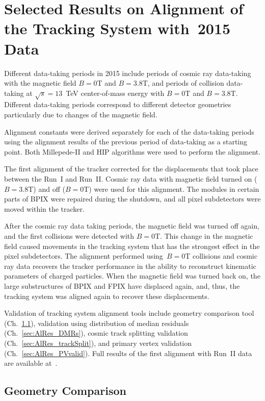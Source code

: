 \section{Selected Results on Alignment of the Tracking System with~2015 Data}
\label{sec:alignmentResults}

Different data-taking periods in 2015 include periods of cosmic ray data-taking with the magnetic field $B=0$T and $B=3.8$T, and periods of collision data-taking at $\sqrt{s}=13$~TeV center-of-mass energy with $B=0$T and $B=3.8$T. Different data-taking periods correspond to different detector geometries particularly due to changes of the magnetic field. 

Alignment constants were derived separately for each of the data-taking periods using the alignment results of the previous period of data-taking as a starting point. Both Millepede-II and HIP algorithms were used to perform the alignment. 

The first alignment of the tracker corrected for the displacements that took place between the Run~I and Run~II. Cosmic ray data with magnetic field turned on ($B=3.8$T) and off ($B=0$T) were used for this alignment. The modules in certain parts of BPIX were repaired during the shutdown, and all pixel subdetectors were moved within the tracker. 

After the cosmic ray data taking periods, the magnetic field was turned off again, and the first collisions were detected with $B=0$T. This change in the magnetic field caused movements in the tracking system that has the strongest effect in the pixel subdetectors. The alignment performed using~$B=0$T collisions and cosmic ray data recovers the tracker performance in the ability to reconstruct kinematic parameters of charged particles. When the magnetic field was turned back on, the large substructures of BPIX and FPIX have displaced again, and, thus, the tracking system was aligned again to recover these displacements.  

Validation of tracking system alignment tools include geometry comparison tool (Ch.~\ref{sec:AlRes_GCP}), validation using distribution of median residuals (Ch.~\ref{sec:AlRes_DMRs}), cosmic track splitting validation (Ch.~\ref{sec:AlRes_trackSplit}), and primary vertex validation (Ch.~\ref{sec:AlRes_PVvalid}). Full results of the first alignment with Run~II data are available at~\cite{ref_AlApproved_twiki}.

\subsection{Geometry Comparison}
\label{sec:AlRes_GCP}


